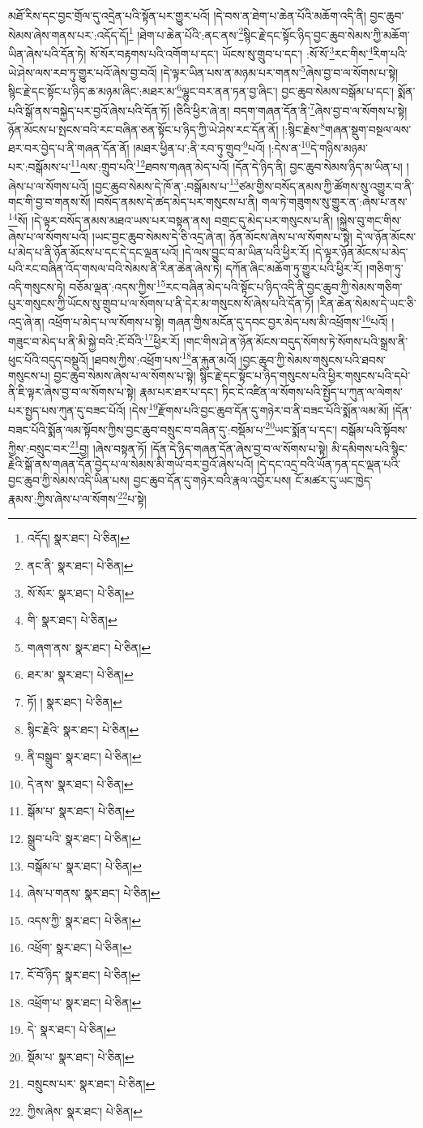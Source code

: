 མཐོ་རིས་དང་བྱང་གྲོལ་དུ་འདྲེན་པའི་སྟོན་པར་གྱུར་པའོ། །དེ་བས་ན་ཐེག་པ་ཆེན་པོའི་མཆོག་འདི་ནི། བྱང་ཆུབ་སེམས་ཞེས་གནས་པར་:འདོད་དོ།\footnote{འདོད།  སྣར་ཐང་།  པེ་ཅིན། } །ཐེག་པ་ཆེན་པོའི་:ནང་ནས་\footnote{ནང་ནི་  སྣར་ཐང་།  པེ་ཅིན། }སྙིང་རྗེ་དང་སྟོང་ཉིད་བྱང་ཆུབ་སེམས་ཀྱི་མཆོག་ཡིན་ཞེས་པའི་དོན་ཏེ། སོ་སོར་བརྟགས་པའི་འགོག་པ་དང་། ཡོངས་སུ་གྲུབ་པ་དང་། :སོ་སོ་\footnote{སོ་སོར་  སྣར་ཐང་།  པེ་ཅིན། }རང་གིས་\footnote{གི་  སྣར་ཐང་།  པེ་ཅིན། }རིག་པའི་ཡེ་ཤེས་ལས་རབ་ཏུ་གྱུར་པའོ་ཞེས་བྱ་བའོ། །དེ་ལྟར་ཡིན་པས་ན་མཉམ་པར་གནས་\footnote{གཞག་ནས་  སྣར་ཐང་།  པེ་ཅིན། }ཞེས་བྱ་བ་ལ་སོགས་པ་སྟེ། སྙིང་རྗེ་དང་སྟོང་པ་ཉིད་ཆ་མཉམ་ཞིང་:མཐར་མ་\footnote{ཐར་མ་  སྣར་ཐང་།  པེ་ཅིན། }ལྷུང་བར་ནན་ཏན་བྱ་ཞིང་། བྱང་ཆུབ་སེམས་བསྒོམ་པ་དང་། སྨོན་པའི་སྒོ་ནས་བསྐྱེད་པར་བྱའོ་ཞེས་པའི་དོན་ཏོ། །ཅིའི་ཕྱིར་ཞེ་ན། བདག་གཞན་དོན་ནི་\footnote{ཏོ། །  སྣར་ཐང་།  པེ་ཅིན། }ཞེས་བྱ་བ་ལ་སོགས་པ་སྟེ། ཉོན་མོངས་པ་སྤངས་བའི་རང་བཞིན་ཅན་སྟོང་པ་ཉིད་ཀྱི་ཡེ་ཤེས་རང་དོན་ནོ། །:སྙིང་རྗེས་\footnote{སྙིང་རྗེའི་  སྣར་ཐང་།  པེ་ཅིན། }གཞན་སྡུག་བསྔལ་ལས་ཐར་བར་བྱེད་པ་ནི་གཞན་དོན་ནོ། །མཐར་ཕྱིན་པ་:ནི་རབ་ཏུ་གྲུབ་\footnote{ནི་བསྒྲུབ་  སྣར་ཐང་།  པེ་ཅིན། }པའོ། །:དེས་ན་\footnote{དེ་ནས་  སྣར་ཐང་།  པེ་ཅིན། }དེ་གཉིས་མཉམ་པར་:བསྒོམས་པ་\footnote{སྒོམ་པ་  སྣར་ཐང་།  པེ་ཅིན། }ལས་:གྲུབ་པའི་\footnote{སྒྲུབ་པའི་  སྣར་ཐང་།  པེ་ཅིན། }ཐབས་གཞན་མེད་པའོ། །དོན་དེ་ཉིད་ནི། བྱང་ཆུབ་སེམས་ཉིད་མ་ཡིན་པ། །ཞེས་པ་ལ་སོགས་པའོ། །བྱང་ཆུབ་སེམས་དེ་ཁོ་ན་:བསྒོམས་པ་\footnote{བསྒོམ་པ་  སྣར་ཐང་།  པེ་ཅིན། }ཙམ་གྱིས་བསོད་ནམས་ཀྱི་ཚོགས་སུ་འགྱུར་བ་ནི་གང་གི་བྱ་བ་གནས་སོ། །བསོད་ནམས་དེ་ཚད་མེད་པར་གསུངས་པ་ནི། གལ་ཏེ་གཟུགས་སུ་གྱུར་ན་:ཞེས་པ་ནས་\footnote{ཞེས་པ་གནས་  སྣར་ཐང་།  པེ་ཅིན། }སོ། །དེ་ལྟར་བསོད་ནམས་མཐའ་ཡས་པར་བསྟན་ནས། བགྲང་དུ་མེད་པར་གསུངས་པ་ནི། །སྐྱེས་བུ་གང་གིས་ཞེས་པ་ལ་སོགས་པའོ། །ཡང་བྱང་ཆུབ་སེམས་དེ་ཅི་འདྲ་ཞེ་ན། ཉོན་མོངས་ཞེས་པ་ལ་སོགས་པ་སྟེ། དེ་ལ་ཉོན་མོངས་པ་མེད་པ་ནི་ཉོན་མོངས་པ་དང་དེ་དང་ལྡན་པའོ། །དེ་ལས་བྱུང་བ་མ་ཡིན་པའི་ཕྱིར་རོ། །དེ་ལྟར་ཉོན་མོངས་པ་མེད་པའི་རང་བཞིན་འོད་གསལ་བའི་སེམས་ནི་རིན་ཆེན་ཞེས་ཏེ། དཀོན་ཞིང་མཆོག་ཏུ་གྱུར་པའི་ཕྱིར་རོ། །གཅིག་ཏུ་འདི་གསུངས་ཏེ། བཅོམ་ལྡན་:འདས་ཀྱིས་\footnote{འདས་ཀྱི་  སྣར་ཐང་།  པེ་ཅིན། }རང་བཞིན་མེད་པའི་སྟོང་པ་ཉིད་འདི་ནི་བྱང་ཆུབ་ཀྱི་སེམས་གཅིག་པུར་གསུངས་ཀྱི་ཡོངས་སུ་གྲུབ་པ་ལ་སོགས་པ་ནི་དེར་མ་གསུངས་སོ་ཞེས་པའི་དོན་ཏོ། །རིན་ཆེན་སེམས་དེ་ཡང་ཅི་འདྲ་ཞེ་ན། འཕྲོག་པ་མེད་པ་ལ་སོགས་པ་སྟེ། གཞན་གྱིས་མངོན་དུ་དབང་བྱར་མེད་པས་མི་འཕྲོགས་\footnote{འཕྲོག་  སྣར་ཐང་།  པེ་ཅིན། }པའོ། །གཟུང་བ་མེད་པ་ནི་མི་སྐྱེ་བའི་:ངོ་བོའི་\footnote{ངོ་བོ་ཉིད་  སྣར་ཐང་།  པེ་ཅིན། }ཕྱིར་རོ། །གང་གིས་ཤེ་ན་ཉོན་མོངས་བདུད་སོགས་ཏེ་སོགས་པའི་སྒྲས་ནི་ཕུང་པོའི་བདུད་བསྡུའོ། །ཐབས་ཀྱིས་:འཕྲོག་པས་\footnote{འཕྲོག་པ་  སྣར་ཐང་།  པེ་ཅིན། }ན་རྐུན་མའོ། །བྱང་ཆུབ་ཀྱི་སེམས་གསུངས་པའི་ཐབས་གསུངས་པ། བྱང་ཆུབ་སེམས་ཞེས་པ་ལ་སོགས་པ་སྟེ། སྙིང་རྗེ་དང་སྟོང་པ་ཉིད་གསུངས་པའི་ཕྱིར་གསུངས་པའི་དཔེ་ནི་ཇི་ལྟར་ཞེས་བྱ་བ་ལ་སོགས་པ་སྟེ། རྣམ་པར་ཐར་པ་དང་། ཏིང་ངེ་འཛིན་ལ་སོགས་པའི་སྤྱོད་པ་ཀུན་ལ་ལེགས་པར་སྤྱད་པས་ཀུན་དུ་བཟང་པོའོ། །དེས་\footnote{དེ་  སྣར་ཐང་།  པེ་ཅིན། }རྫོགས་པའི་བྱང་ཆུབ་དོན་དུ་གཉེར་བ་ནི་བཟང་པོའི་སྨོན་ལམ་མོ། །དོན་བཟང་པོའི་སྨོན་ལམ་སྟོབས་ཀྱིས་བྱང་ཆུབ་བསྲུང་བ་བཞིན་དུ་:བསྡོམ་པ་\footnote{སྡོམ་པ་  སྣར་ཐང་།  པེ་ཅིན། }ཡང་སྨོན་པ་དང་། བསྒོམ་པའི་སྟོབས་ཀྱིས་:བསྲུང་བར་\footnote{བསྲུངས་པར་  སྣར་ཐང་།  པེ་ཅིན། }བྱ། །ཞེས་བསྟན་ཏོ། །དོན་དེ་ཉིད་གཞན་དོན་ཞེས་བྱ་བ་ལ་སོགས་པ་སྟེ། མི་དམིགས་པའི་སྙིང་རྗེའི་སྒོ་ནས་གཞན་དོན་བྱེད་པ་ལ་སེམས་མི་གཡོ་བར་བྱའོ་ཞེས་པའོ། །དེ་དང་འདྲ་བའི་ཡོན་ཏན་དང་ལྡན་པའི་བྱང་ཆུབ་ཀྱི་སེམས་འདི་ཡིན་པས། བྱང་ཆུབ་དོན་དུ་གཉེར་བའི་རྣལ་འབྱོར་པས། ངོ་མཚར་དུ་ཡང་ཁྱེད་རྣམས་:ཀྱིས་ཞེས་པ་ལ་སོགས་\footnote{ཀྱིས་ཞེས་  སྣར་ཐང་།  པེ་ཅིན། }པ་སྟེ། 
